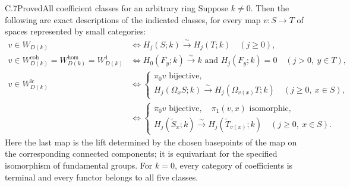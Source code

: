 \begin{claim}{C.7}{Proved}{All coefficient classes for an arbitrary ring}
Suppose $k\ne0$.  Then the following are exact descriptions of the indicated classes, for every map $v:S\to T$ of spaces represented by small categories:
\begin{align*}
 v\in W_{D(k)}
 &\Longleftrightarrow H_j(S;k)\xrightarrow{\sim}H_j(T;k)\quad(j\geq0),\\
 v\in W_{D(k)}^{\mathrm{coh}}=W_{D(k)}^{\mathrm{hom}}=W_{D(k)}^1
 &\Longleftrightarrow H_0(F_y;k)\xrightarrow{\sim}k\text{ and }H_j(F_y;k)=0\quad(j>0,\ y\in T),\\
 v\in W_{D(k)}^{\mathrm{lc}}
 &\Longleftrightarrow \begin{cases}
 \pi_0v\text{ bijective},\\
 H_j(\Omega_xS;k)\xrightarrow{\sim}H_j(\Omega_{v(x)}T;k)
       \quad(j\geq0,\ x\in S),
 \end{cases}\\
 &\Longleftrightarrow \begin{cases}
 \pi_0v\text{ bijective},\quad\pi_1(v,x)\text{ isomorphic},\\
 H_j(\widetilde S_x;k)\xrightarrow{\sim}H_j(\widetilde T_{v(x)};k)
       \quad(j\geq0,\ x\in S).
 \end{cases}
\end{align*}
Here the last map is the lift determined by the chosen basepoints of the map on the corresponding connected components; it is equivariant for the specified isomorphism of fundamental groups.  For $k=0$, every category of coefficients is terminal and every functor belongs to all five classes.
\end{claim}
